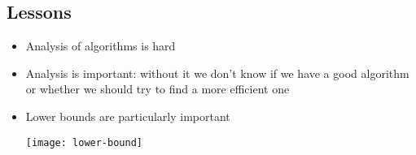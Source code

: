 
\begin{slide}
\section[-2]{Lessons}

\begin{PauseHighLight}
  \begin{itemize}
  \item Analysis of algorithms is hard\pause
  \item Analysis is important: without it we don't know if we have a good
    algorithm or whether we should try to find a more efficient one\pause
  \item Lower bounds are particularly important
    \begin{center}
      \texttt{[image: lower-bound]}\pause
    \end{center}
  \end{itemize}
\end{PauseHighLight}

\end{slide}
